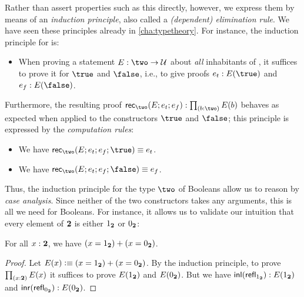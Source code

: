 Rather than assert properties such as this directly, however, we express them by means of an \emph{induction principle}, also called a \emph{(dependent) elimination rule}.
We have seen these principles already in \autoref{cha:typetheory}.
For instance, the induction principle for \bool is:

\begin{itemize}
\item When proving a statement $E : \two \to \type$ about \emph{all} inhabitants of \bool, it suffices to prove it for $\true$ and $\false$, i.e., to give proofs $ e_t : E(\true)$ and $e_f : E(\false)$.
\end{itemize}

Furthermore, the resulting proof $\rec\two(E;e_t;e_f): \prd{b : \two}E(b)$ behaves as expected when applied to the constructors $\true$ and $\false$; this principle is expressed by the \emph{computation rules}:
\begin{itemize}
\item We have $\rec\two(E;e_t;e_f;\true) \jdeq e_t$.
\item We have $\rec\two(E;e_t;e_f;\false) \jdeq e_f$.
\end{itemize}

Thus, the induction principle for the type $\two$ of Booleans allow us to reason by \emph{case analysis}.
Since neither of the two constructors takes any arguments, this is all we need for Booleans.
For instance, it allows us to validate our intuition that every element of $\mathbf{2}$ is either ${1_{\mathbf{2}}}$ or ${0_{\mathbf{2}}}$:

\begin{lem}\label{thm:allbool-trueorfalse}
  For all $x:\mathbf{2}$, we have $(x={1_{\mathbf{2}}}) + (x={0_{\mathbf{2}}})$.
\end{lem}
\begin{proof}
  Let $E(x)\vcentcolon\equiv (x={1_{\mathbf{2}}}) + (x={0_{\mathbf{2}}})$.
  By the induction principle, to prove $\prd{x:\bool} E(x)$ it suffices to prove $E({1_{\mathbf{2}}})$ and $E({0_{\mathbf{2}}})$.
  But we have ${\mathsf{inl}}(\mathsf{refl}_{{1_{\mathbf{2}}}}):E({1_{\mathbf{2}}})$ and ${\mathsf{inr}}(\mathsf{refl}_{{0_{\mathbf{2}}}}):E({0_{\mathbf{2}}})$.
\end{proof}

